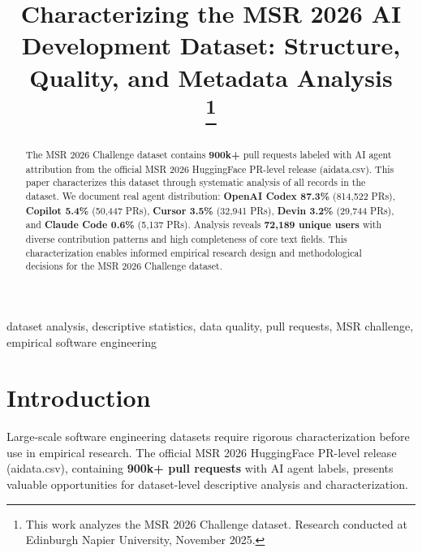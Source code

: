 \documentclass[conference]{IEEEtran}
\begin{document}
\title{Characterizing the MSR 2026 AI Development Dataset: Structure, Quality, and Metadata Analysis\\
\thanks{This work analyzes the MSR 2026 Challenge dataset. Research conducted at Edinburgh Napier University, November 2025.}
}

\author{
}

\maketitle

\begin{abstract}
The MSR 2026 Challenge dataset contains \textbf{900k+} pull requests labeled with AI agent attribution from the official MSR 2026 HuggingFace PR-level release (aidata.csv). This paper characterizes this dataset through systematic analysis of all records in the dataset. We document real agent distribution: \textbf{OpenAI Codex 87.3\%} (814,522 PRs), \textbf{Copilot 5.4\%} (50,447 PRs), \textbf{Cursor 3.5\%} (32,941 PRs), \textbf{Devin 3.2\%} (29,744 PRs), and \textbf{Claude Code 0.6\%} (5,137 PRs). Analysis reveals \textbf{72,189 unique users} with diverse contribution patterns and high completeness of core text fields. This characterization enables informed empirical research design and methodological decisions for the MSR 2026 Challenge dataset.
\end{abstract}

\begin{IEEEkeywords}
dataset analysis, descriptive statistics, data quality, pull requests, MSR challenge, empirical software engineering
\end{IEEEkeywords}

\section{Introduction}

Large-scale software engineering datasets require rigorous characterization before use in empirical research. The official MSR 2026 HuggingFace PR-level release (aidata.csv), containing \textbf{900k+ pull requests} with AI agent labels, presents valuable opportunities for dataset-level descriptive analysis and characterization.
\end{document}
